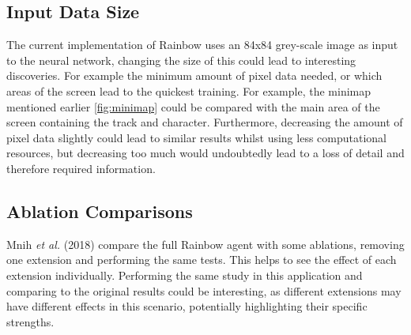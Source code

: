 \subsection{Input Data Size}
The current implementation of Rainbow uses an 84x84 grey-scale image as input to the neural network, changing the size of this could lead to interesting discoveries. For example the minimum amount of pixel data needed, or which areas of the screen lead to the quickest training. For example, the minimap mentioned earlier \ref{fig:minimap}  could be compared with the main area of the screen containing the track and character. Furthermore, decreasing the amount of pixel data slightly could lead to similar results whilst using less computational resources, but decreasing too much would undoubtedly lead to a loss of detail and therefore required information.
\subsection{Ablation Comparisons}
Mnih \textit{et al.} (2018) \cite{hessel2018rainbow} compare the full Rainbow agent with some ablations, removing one extension and performing the same tests. This helps to see the effect of each extension individually. Performing the same study in this application and comparing to the original results could be interesting, as different extensions may have different effects in this scenario, potentially highlighting their specific strengths. 
